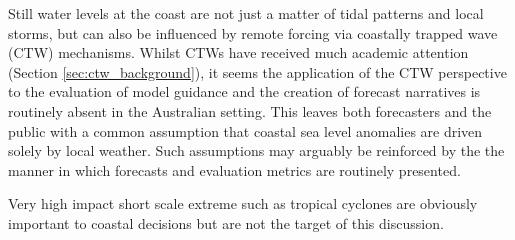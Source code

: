 Still water levels \citep{Pugh:2014di} at the coast are not just a matter of tidal patterns and local storms, but can also be influenced by remote forcing via coastally trapped wave (CTW) mechanisms.
Whilst CTWs have received much academic attention (Section \ref{sec:ctw_background}), it seems the application of the CTW perspective to the evaluation of model guidance and the creation of forecast narratives is routinely absent in the Australian setting. 
This leaves both forecasters and the public with a common assumption that coastal sea level anomalies are driven solely by local weather. Such assumptions may arguably be reinforced by the the manner in which forecasts and evaluation metrics are routinely presented.

Very high impact short scale extreme such as tropical cyclones \citep{McInnes:2016km} are obviously important to coastal decisions but are not the target of this discussion. 



